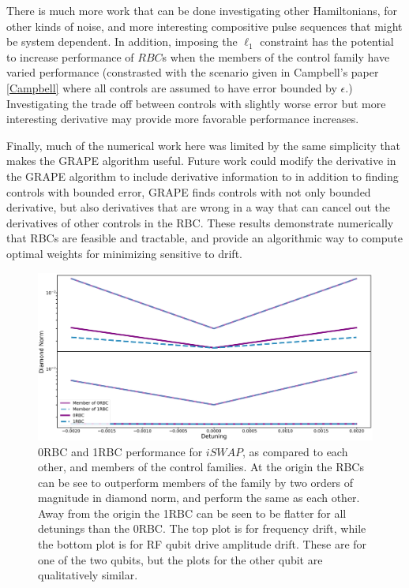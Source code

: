 \documentclass[aps,nofootinbib,pra,notitlepage,twocolumn]{revtex4-1}
\begin{document}
There is much more work that can be done investigating other Hamiltonians, for other kinds of noise, and more interesting compositive pulse sequences that might be system dependent. In addition, imposing the $\ell_1$ constraint has the potential to increase performance of $RBC$s when the members of the control family have varied performance (constrasted with the scenario given in Campbell's paper \ref{Campbell} where all controls are assumed to have error bounded by $\epsilon$.) Investigating the trade off between controls with slightly worse error but more interesting derivative may provide more favorable performance increases.

Finally, much of the numerical work here was limited by the same simplicity that makes the GRAPE algorithm useful. Future work could modify the derivative in the GRAPE algorithm to include derivative information to in addition to finding controls with bounded error, GRAPE finds controls with not only bounded derivative, but also derivatives that are wrong in a way that can cancel out the derivatives of other controls in the RBC. These results demonstrate numerically that RBCs are feasible and tractable, and provide an algorithmic way to compute optimal weights for minimizing sensitive to drift.

\begin{figure}[htb]
  \centering
  \includegraphics[scale=.1]{figures/2QRBC}

\caption{0RBC and 1RBC performance for $iSWAP$, as compared to each other, and members of the control families. At the origin the RBCs can be see to outperform members of the family by two orders of magnitude in diamond norm, and perform the same as each other. Away from the origin the 1RBC can be seen to be flatter for all detunings than the 0RBC. The top plot is for frequency drift, while the bottom plot is for RF qubit drive amplitude drift. These are for one of the two qubits, but the plots for the other qubit are qualitatively similar.}
\end{figure}
\end{document}
